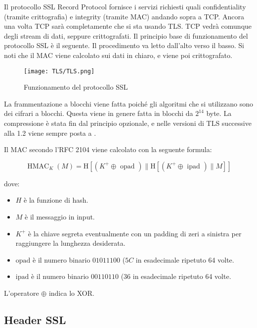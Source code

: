 \documentclass[14pt]{extreport}
\begin{document}
Il protocollo SSL Record Protocol fornisce i servizi richiesti quali confidentiality (tramite crittografia) e integrity (tramite MAC) andando sopra a TCP. Ancora una volta TCP sarà completamente  che si sta usando TLS. TCP vedrà comunque degli stream di dati, seppure crittografati.
Il principio base di funzionamento del protocollo SSL è il seguente. Il procedimento va letto dall'alto verso il basso. Si noti che il MAC viene calcolato sui dati in chiaro, e viene poi crittografato.

\begin{figure}[H]
    \centering
    \texttt{[image: TLS/TLS.png]}
    \caption{Funzionamento del protocollo SSL}
\end{figure}

La frammentazione a blocchi viene fatta poiché gli algoritmi che si utilizzano sono dei cifrari a blocchi. Questa viene in genere fatta in blocchi da $2^{14}$ byte. La compressione è stata fin dal principio opzionale, e nelle versioni di TLS successive alla 1.2 viene sempre posta a .

Il MAC secondo l'RFC 2104 viene calcolato con la seguente formula:


$$
\operatorname{HMAC}_{K}(M)=\mathrm{H}\left[\left(K^{+} \oplus \text { opad }\right) \| \mathrm{H}\left[\left(K^{+} \oplus \text { ipad }\right) \| M\right]\right]
$$

dove:


\begin{itemize}
    \item $H$ è la funzione di hash.
    
    \item $M$ è il messaggio in input.
    
    
    \item $K^{+}$ è la chiave segreta eventualmente con un padding di zeri a sinistra per raggiungere la lunghezza desiderata.
    
    
    \item $\text{opad}$ è il numero binario $01011100$ ($5C$ in esadecimale ripetuto 64 volte.
    
    \item $\text{ipad}$ è il numero binario $00110110$ ($36$ in esadecimale ripetuto 64 volte.
\end{itemize}
L'operatore $\oplus$ indica lo XOR.

\subsection{Header SSL}
\end{document}
